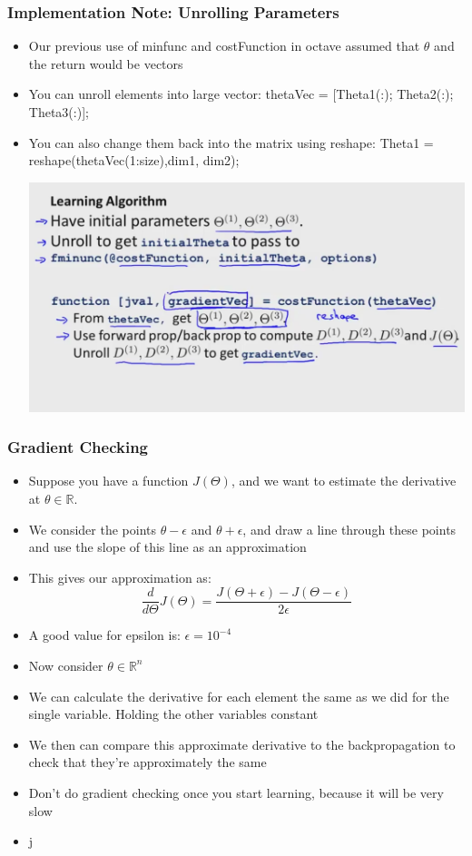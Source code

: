 \subsubsection{Implementation Note: Unrolling Parameters}
\begin{itemize}[--]
	\item Our previous use of minfunc and costFunction in octave assumed that $\theta$ and the return would be vectors
	\item You can unroll elements into  large vector:
		thetaVec = [Theta1(:); Theta2(:); Theta3(:)];
	\item You can also change them back into the matrix using reshape:
		Theta1 = reshape(thetaVec(1:size),dim1, dim2);
	\begin{center}
		\includegraphics[scale=0.2]{sections/cs229/w6/algo.png}
	\end{center}
\end{itemize}

\subsubsection{Gradient Checking}
\begin{itemize}[--]
	\item Suppose you have a function $J(\Theta)$, and we want to estimate the derivative at $\theta\in\mathbb{R}$.
	\item We consider the points $\theta - \epsilon$ and $\theta + \epsilon$, and draw a line through these points and use the slope of this line as an approximation
	\item This gives our approximation as:
		$$\frac{d}{d\Theta} J(\Theta) = \frac{J(\Theta + \epsilon) - J(\Theta - \epsilon)}{2\epsilon}$$
	\item A good value for epsilon is: $\epsilon= 10^{-4}$
	\item Now consider $\theta\in\mathbb{R}^{n}$
	\item We can calculate the derivative for each element the same as we did for the single variable. Holding the other variables constant
	\item We then can compare this approximate derivative to the backpropagation to check that they're approximately the same
	\item Don't do gradient checking once you start learning, because it will be very slow
	\item j
\end{itemize}

